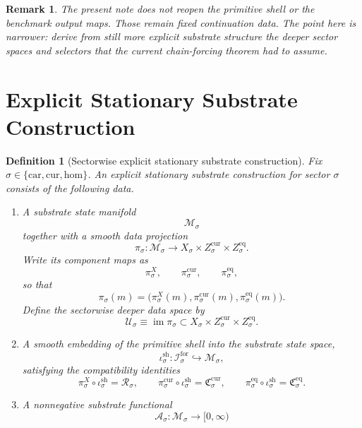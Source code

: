 \documentclass[11pt]{article}
\newcommand{\Car}{\mathrm{car}}
\newcommand{\Cur}{\mathrm{cur}}
\newcommand{\Hom}{\mathrm{hom}}
\newcommand{\ForSpace}[1]{\mathcal I_{#1}^{\mathrm{for}}}
\newcommand{\Reduction}[1]{\mathcal R_{#1}}
\newcommand{\CurrentCarrier}[1]{\mathfrak C_{#1}^{\mathrm{cur}}}
\newcommand{\EqCarrier}[1]{\mathfrak C_{#1}^{\mathrm{eq}}}
\newcommand{\SubSpace}[1]{\mathcal M_{#1}}
\newcommand{\DataProj}[1]{\pi_{#1}}
\newcommand{\SubVisible}[1]{\pi_{#1}^{X}}
\newcommand{\SubCurrent}[1]{\pi_{#1}^{\mathrm{cur}}}
\newcommand{\SubEq}[1]{\pi_{#1}^{\mathrm{eq}}}
\newcommand{\ShellEmbed}[1]{\iota_{#1}^{\mathrm{sh}}}
\newcommand{\StationaryFunctional}[1]{\mathscr A_{#1}}
\newcommand{\DeepSpace}[1]{\mathcal U_{#1}}
\newtheorem{definition}{Definition}
\newtheorem{remark}{Remark}
\begin{document}
\begin{remark}
The present note does not reopen the primitive shell or the benchmark output maps. Those remain fixed continuation data. The point here is narrower: derive from still more explicit substrate structure the deeper sector spaces and selectors that the current chain-forcing theorem had to assume.
\end{remark}

\section{Explicit Stationary Substrate Construction}

\begin{definition}[Sectorwise explicit stationary substrate construction]
\label{def:construction}
Fix \(\sigma\in\{\Car,\Cur,\Hom\}\). An \emph{explicit stationary substrate construction} for sector \(\sigma\) consists of the following data.
\begin{enumerate}
    \item A substrate state manifold
    \[
    \SubSpace{\sigma}
    \]
    together with a smooth data projection
    \[
    \DataProj{\sigma}:\SubSpace{\sigma}\to
    X_{\sigma}\times Z_{\sigma}^{\mathrm{cur}}\times Z_{\sigma}^{\mathrm{eq}}.
    \]
    Write its component maps as
    \[
    \SubVisible{\sigma},\qquad
    \SubCurrent{\sigma},\qquad
    \SubEq{\sigma},
    \]
    so that
    \[
    \DataProj{\sigma}(m)
    =
    \bigl(
    \SubVisible{\sigma}(m),
    \SubCurrent{\sigma}(m),
    \SubEq{\sigma}(m)
    \bigr).
    \]
    Define the sectorwise deeper data space by
    \[
    \DeepSpace{\sigma}
    \equiv
    \operatorname{im}\DataProj{\sigma}
    \subset
    X_{\sigma}\times Z_{\sigma}^{\mathrm{cur}}\times Z_{\sigma}^{\mathrm{eq}}.
    \]
    \item A smooth embedding of the primitive shell into the substrate state space,
    \[
    \ShellEmbed{\sigma}:\ForSpace{\sigma}\hookrightarrow \SubSpace{\sigma},
    \]
    satisfying the compatibility identities
    \begin{equation}
    \SubVisible{\sigma}\circ \ShellEmbed{\sigma}
    =
    \Reduction{\sigma},
    \qquad
    \SubCurrent{\sigma}\circ \ShellEmbed{\sigma}
    =
    \CurrentCarrier{\sigma},
    \qquad
    \SubEq{\sigma}\circ \ShellEmbed{\sigma}
    =
    \EqCarrier{\sigma}.
    \label{eq:embedcompat}
    \end{equation}
    \item A nonnegative substrate functional
    \[
    \StationaryFunctional{\sigma}:\SubSpace{\sigma}\to[0,\infty)
\]
\end{enumerate}
\end{definition}
\end{document}
